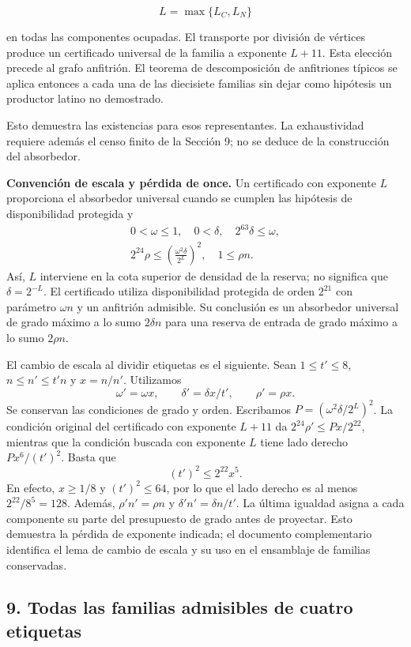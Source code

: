 \documentclass[spanish,11pt,a4paper]{article}
\begin{document}
\[L=\max\{L_C,L_N\}\]

en todas las componentes ocupadas. El transporte por división de vértices produce un certificado universal de la familia a exponente \(L+11\). Esta elección precede al grafo anfitrión. El teorema de descomposición de anfitriones típicos se aplica entonces a cada una de las diecisiete familias sin dejar como hipótesis un productor latino no demostrado.

Esto demuestra las existencias para esos representantes. La exhaustividad requiere además el censo finito de la Sección 9; no se deduce de la construcción del absorbedor.

\textbf{Convención de escala y pérdida de once.} Un certificado con exponente \(L\) proporciona el absorbedor universal cuando se cumplen las hipótesis de disponibilidad protegida y \[\begin{gathered}
0<\omega\le1,\quad 0<\delta,\quad 2^{63}\delta\le\omega,\\
2^{24}\rho\le\left(\frac{\omega^2\delta}{2^L}\right)^2,
\quad 1\le\rho n.
\end{gathered}\] Así, \(L\) interviene en la cota superior de densidad de la reserva; no significa que \(\delta=2^{-L}\). El certificado utiliza disponibilidad protegida de orden \(2^{21}\) con parámetro \(\omega n\) y un anfitrión admisible. Su conclusión es un absorbedor universal de grado máximo a lo sumo \(2\delta n\) para una reserva de entrada de grado máximo a lo sumo \(2\rho n\).

El cambio de escala al dividir etiquetas es el siguiente. Sean \(1\le t'\le8\), \(n\le n'\le t'n\) y \(x=n/n'\). Utilizamos \[\omega'=\omega x,\qquad \delta'=\delta x/t',\qquad \rho'=\rho x.\] Se conservan las condiciones de grado y orden. Escribamos \(P=(\omega^2\delta/2^L)^2\). La condición original del certificado con exponente \(L+11\) da \(2^{24}\rho'\le Px/2^{22}\), mientras que la condición buscada con exponente \(L\) tiene lado derecho \(Px^6/(t')^2\). Basta que \[(t')^2\le2^{22}x^5.\] En efecto, \(x\ge1/8\) y \((t')^2\le64\), por lo que el lado derecho es al menos \(2^{22}/8^5=128\). Además, \(\rho'n'=\rho n\) y \(\delta'n'=\delta n/t'\). La última igualdad asigna a cada componente su parte del presupuesto de grado antes de proyectar. Esto demuestra la pérdida de exponente indicada; el documento complementario identifica el lema de cambio de escala y su uso en el ensamblaje de familias conservadas.

\subsection{9. Todas las familias admisibles de cuatro etiquetas}\label{todas-las-familias-admisibles-de-cuatro-etiquetas}
\end{document}
